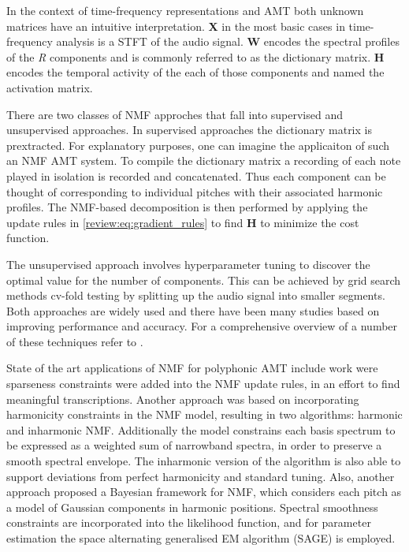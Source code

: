 In the context of time-frequency representations and AMT both unknown matrices
have an intuitive interpretation. \textbf{X} in the most basic cases in
time-frequency analysis is a STFT of the audio signal. \textbf{W} encodes the
spectral profiles of the \emph{R} components and is commonly referred to as the
dictionary matrix. \textbf{H} encodes the temporal activity of the each of those
components and named the activation matrix.

There are two classes of NMF approches that fall into supervised and
unsupervised approaches. In supervised approaches the dictionary matrix is
prextracted. For explanatory purposes, one can imagine the applicaiton of such
an NMF AMT system. To compile the dictionary matrix a recording of each note
played in isolation is recorded and concatenated. Thus each component can be
thought of corresponding to individual pitches with their associated harmonic
profiles. The NMF-based decomposition is then performed by applying the update
rules in \autoref{review:eq:gradient_rules} to find \textbf{H} to minimize the
cost function.

The unsupervised approach involves hyperparameter tuning to discover the optimal
value for the number of components. This can be achieved by grid search methods
cv-fold testing by splitting up the audio signal into smaller segments. Both
approaches are widely used and there have been many studies based on improving
performance and accuracy. For a comprehensive overview of a number of these
techniques refer to \cite{f0estimation2006:Cheveigne,Christensen:2009,
  spmmt:Klapuri}.

State of the art applications of NMF for polyphonic AMT include work were
sparseness constraints were added into the NMF update rules, in an effort to
find meaningful transcriptions. \cite{NMF-sparsity:2006} Another approach was
based on incorporating harmonicity constraints in the NMF model, resulting in
two algorithms: harmonic and inharmonic NMF. \cite{inharm-harm-NMF:Vincent2010}
Additionally the model constrains each basis spectrum to be expressed as a
weighted sum of narrowband spectra, in order to preserve a smooth spectral
envelope. The inharmonic version of the algorithm is also able to support
deviations from perfect harmonicity and standard tuning. Also, another approach
proposed a Bayesian framework for NMF, which considers each pitch as a model of
Gaussian components in harmonic positions. \cite{bayesian-NMF:Bertin2007}
Spectral smoothness constraints are incorporated into the likelihood function,
and for parameter estimation the space alternating generalised EM algorithm
(SAGE) is employed.

